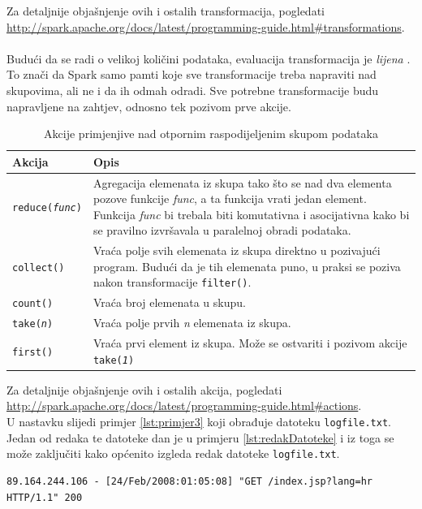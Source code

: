 \documentclass[times, utf8, zavrsni, numeric]{fer}
\begin{document}
Za detaljnije objašnjenje ovih i ostalih transformacija, pogledati \url{http://spark.apache.org/docs/latest/programming-guide.html#transformations}.
\\
\\
Budući da se radi o velikoj količini podataka, evaluacija transformacija je \emph{lijena} . To znači da Spark samo pamti koje sve transformacije treba napraviti nad skupovima, ali ne i da ih odmah odradi. Sve potrebne transformacije budu napravljene na zahtjev, odnosno tek pozivom prve akcije. 
\newpage
\begin{table}[htb]
\caption{Akcije primjenjive nad otpornim raspodijeljenim skupom podataka}
\label{tbl:akcije}
\centering
\begin{tabular}{lp{8cm}} 
\hline
Akcija & Opis \\
\hline
\texttt{reduce(\emph{func})} & Agregacija elemenata iz skupa tako što se nad dva elementa pozove funkcije \emph{func}, a ta funkcija vrati jedan element. Funkcija \emph{func} bi trebala biti komutativna i asocijativna kako bi se pravilno izvršavala u paralelnoj obradi podataka.\\
\texttt{collect()} & Vraća polje svih elemenata iz skupa direktno u pozivajući program. Budući da je tih elemenata puno, u praksi se poziva nakon transformacije \texttt{filter()}. \\
\texttt{count()} & Vraća broj elemenata u skupu. \\
\texttt{take(\emph{n})} & Vraća polje prvih \emph{n} elemenata iz skupa. \\
\texttt{first()} & Vraća prvi element iz skupa. Može se ostvariti i pozivom akcije \texttt{take(\emph{1})}\\
\hline
\end{tabular}
\end{table}
Za detaljnije objašnjenje ovih i ostalih akcija, pogledati \url{http://spark.apache.org/docs/latest/programming-guide.html#actions}.
\\

U nastavku slijedi primjer \ref{lst:primjer3} koji obrađuje datoteku \texttt{logfile.txt}.
Jedan od redaka te datoteke dan je u primjeru \ref{lst:redakDatoteke} i iz toga se može zaključiti kako općenito izgleda redak datoteke \texttt{logfile.txt}.
\begin{lstlisting}[label={lst:redakDatoteke}, basicstyle=\small, caption={Korištenje transformacija i akcija.}]
89.164.244.106 - [24/Feb/2008:01:05:08] "GET /index.jsp?lang=hr HTTP/1.1" 200
\end{lstlisting}
\end{document}
